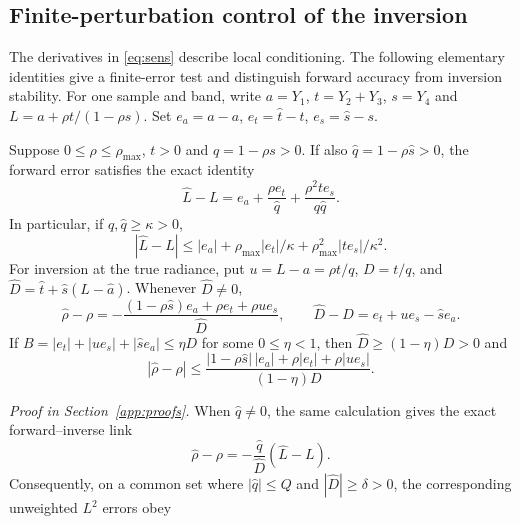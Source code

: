 \subsection{Finite-perturbation control of the inversion}\label{sec:stability}

The derivatives in \eqref{eq:sens} describe local conditioning. The following elementary
identities give a finite-error test and distinguish forward accuracy from inversion stability.
For one sample and band, write $a=Y_1$, $t=Y_2+Y_3$, $s=Y_4$ and
$L=a+\rho t/(1-\rho s)$. Set
$e_a=\widehat a-a$, $e_t=\widehat t-t$, $e_s=\widehat s-s$.

\begin{proposition}\label{prop:stability}
Suppose $0\le\rho\le\rho_{\max}$, $t>0$ and $q=1-\rho s>0$. If also
$\widehat q=1-\rho\widehat s>0$, the forward error satisfies the exact identity
\begin{equation}\label{eq:forward-error}
 \widehat L-L=e_a+\frac{\rho e_t}{\widehat q}
                  +\frac{\rho^2 t e_s}{q\widehat q}.
\end{equation}
In particular, if $q,\widehat q\ge\kappa>0$,
\[
 |\widehat L-L|\le |e_a|+\rho_{\max}|e_t|/\kappa
                         +\rho_{\max}^2|t e_s|/\kappa^2.
\]
For inversion at the true radiance, put
$u=L-a=\rho t/q$, $D=t/q$, and
$\widehat D=\widehat t+\widehat s(L-\widehat a)$. Whenever $\widehat D\ne0$,
\begin{equation}\label{eq:inverse-error}
 \widehat\rho-\rho=
 -\frac{(1-\rho\widehat s)e_a+\rho e_t+\rho u e_s}{\widehat D},
 \qquad
 \widehat D-D=e_t+u e_s-\widehat s e_a.
\end{equation}
If
$B=|e_t|+|u e_s|+|\widehat s e_a|\le\eta D$ for some $0\le\eta<1$, then
$\widehat D\ge(1-\eta)D>0$ and
\begin{equation}\label{eq:inverse-bound}
 |\widehat\rho-\rho|\le
 \frac{|1-\rho\widehat s|\,|e_a|+\rho|e_t|+\rho|u e_s|}{(1-\eta)D}.
\end{equation}
\end{proposition}
\noindent\emph{Proof in Section~\ref{app:proofs}.}
When $\widehat q\ne0$, the same calculation gives the exact forward--inverse link
\begin{equation}\label{eq:forward-inverse-link}
 \widehat\rho-\rho=-\frac{\widehat q}{\widehat D}(\widehat L-L).
\end{equation}
Consequently, on a common set where $|\widehat q|\le Q$ and
$|\widehat D|\ge\delta>0$, the corresponding unweighted $L^2$ errors obey
